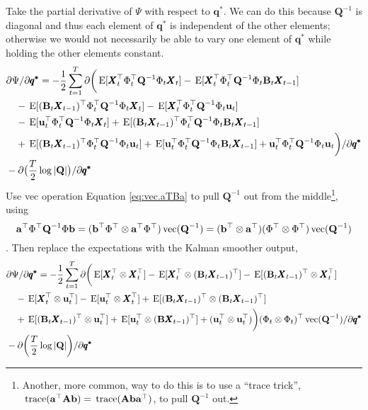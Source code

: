\documentclass[]{article}
\def\UPS{\mbox{\boldmath $\Upsilon$}}
\def\AA{\mbox{$\mathbf A$}}	\def\aa{\mbox{$\mathbf a$}}
\def\BB{\mbox{$\mathbf B$}}	\def\bb{\mbox{$\mathbf b$}} \def\Bb{\mbox{$\mathbf J$}} \def\Ba{\mbox{$\mathbf L$}} \def\Bm{\UPS}
\def\E{\,\textup{\textrm{E}}}
\def\QQ{\mbox{$\mathbf Q$}}	 \def\qq{\mbox{$\mathbf q$}} \def\Qb{\mbox{$\mathbf G$}}  \def\Qm{\mathbb{Q}}
\def\XX{\mbox{$\pmb{X}$}}	\def\xx{\mbox{$\pmb{x}$}}
\def\vec{\,\textup{\textrm{vec}}}
\def\trace{\,\textup{\textrm{trace}}}
\begin{document}
Take the partial derivative of $\Psi$ with respect to $\pmb{q^{*}}$.  We can do this because $\QQ^{-1}$ is diagonal and thus each element of $\pmb{q^{*}}$ is independent of the other elements; otherwise we would not necessarily be able to vary one element of $\pmb{q^{*}}$ while holding the other elements constant.
\begin{equation}
\begin{split}
&\partial\Psi/\partial\pmb{q^{*}} = -\frac{1}{2} \sum_{t=1}^T\partial\bigg(
\E[\XX_t^\top\Phi_t^\top\QQ^{-1}\Phi_t\XX_t]
-\E[\XX_t^\top\Phi_t^\top\QQ^{-1}\Phi_t\BB_t\XX_{t-1}] \\
&\quad -\E[(\BB_t\XX_{t-1})^\top\Phi_t^\top\QQ^{-1}\Phi_t\XX_t] 
 - \E[\XX_t^\top\Phi_t^\top\QQ^{-1}\Phi_t\uu_t] \\
&\quad - \E[\uu_t^\top\Phi_t^\top\QQ^{-1}\Phi_t\XX_t] 
+ \E[(\BB_t\XX_{t-1})^\top\Phi_t^\top\QQ^{-1}\Phi_t\BB_t\XX_{t-1}] \\
&\quad + \E[(\BB_t\XX_{t-1})^\top\Phi_t^\top\QQ^{-1}\Phi_t\uu_t] 
+ \E[\uu_t^\top\Phi_t^\top\QQ^{-1}\Phi_t\BB_t\XX_{t-1}] + \uu_t^\top\Phi_t^\top\QQ^{-1}\Phi_t\uu_t \bigg)/\partial\pmb{q^{*}}\\
& - \partial\big(\frac{T}{2}\log |\QQ| \big)/\partial\pmb{q^{*}} \\
\end{split}
\end{equation}
Use vec operation Equation \ref{eq:vec.aTBa} to pull $\QQ^{-1}$ out from the middle\footnote{Another, more common, way to do this is to use a ``trace trick'', $\trace(\aa^\top\AA\bb)=\trace(\AA\bb\aa^\top)$, to pull $\QQ^{-1}$ out.}, using 
$$\aa^\top \Phi^\top \QQ^{-1} \Phi \bb = (\bb^\top\Phi^\top \otimes \aa^\top \Phi^\top)\vec(\QQ^{-1}) = (\bb^\top \otimes \aa^\top)(\Phi^\top \otimes \Phi^\top)\vec(\QQ^{-1})$$.
Then replace the expectations with the Kalman smoother output,
\begin{equation}\label{eq:Q.gendiag2}
\begin{split}
&\partial\Psi/\partial\pmb{q^{*}} = -\frac{1}{2} \sum_{t=1}^T\partial\bigg(
\E[\XX_t^\top \otimes \XX_t^\top ]
-\E[\XX_t^\top \otimes (\BB_t\XX_{t-1})^\top] -\E[(\BB_t\XX_{t-1})^\top \otimes \XX_t^\top] \\
&\quad  - \E[\XX_t^\top \otimes \uu_t^\top] - \E[\uu_t^\top \otimes \XX_t^\top]
+ \E[(\BB_t\XX_{t-1})^\top \otimes (\BB_t\XX_{t-1})^\top] \\
&\quad + \E[(\BB_t\XX_{t-1})^\top \otimes \uu_t^\top]
+ \E[\uu_t^\top \otimes (\BB\XX_{t-1})^\top] + (\uu_t^\top \otimes \uu_t^\top) \bigg)(\Phi_t \otimes \Phi_t)^\top\vec(\QQ^{-1})/\partial\pmb{q^{*}}\\
& - \partial\bigg(\frac{T}{2}\log |\QQ| \bigg)/\partial\pmb{q^{*}} \\
\end{split}
\end{equation}
\end{document}
